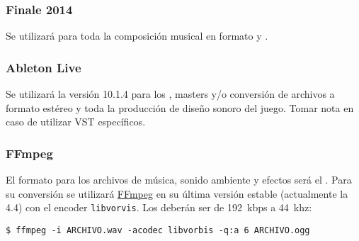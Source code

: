 \subsubsection{Finale 2014}
Se utilizará para toda la composición musical en formato  y .

\subsubsection{Ableton Live}
Se utilizará la versión 10.1.4 para los , masters y/o conversión de archivos  a formato  estéreo y toda la producción de diseño sonoro del juego. Tomar nota en caso de utilizar VST específicos.

\subsubsection{FFmpeg}
El formato para los archivos de música, sonido ambiente y efectos será el . Para su conversión se utilizará \href{http://ffmpeg.org/}{FFmpeg} en su última versión estable (actualmente la 4.4) con el encoder \texttt{libvorvis}. Los  deberán ser de 192~kbps a 44~khz:
\lstset{style=bash}
\begin{lstlisting}
$ ffmpeg -i ARCHIVO.wav -acodec libvorbis -q:a 6 ARCHIVO.ogg
\end{lstlisting}